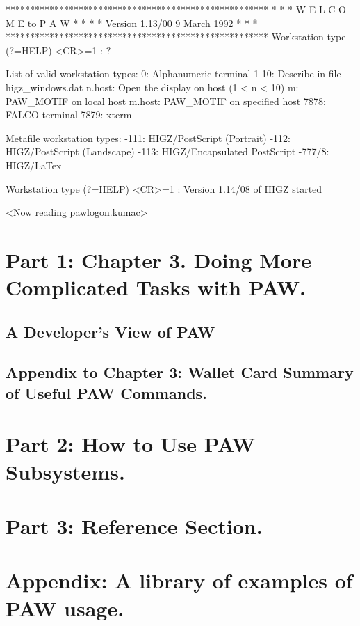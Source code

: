 \begin{XMP}
 ******************************************************
 *                                                    *
 *            W E L C O M E    to   P A W             *
 *                                                    *
 *           Version 1.13/00  9 March 1992            *
 *                                                    *
 ******************************************************
 Workstation type (?=HELP) <CR>=1 : ?
 
 List of valid workstation types:
       0:  Alphanumeric terminal
    1-10:  Describe in file higz_windows.dat
  n.host:  Open the display on host (1 < n < 10)
       m:  PAW_MOTIF on local host
  m.host:  PAW_MOTIF on specified host
    7878:  FALCO terminal
    7879:  xterm
 
 Metafile workstation types:
    -111:  HIGZ/PostScript (Portrait)
    -112:  HIGZ/PostScript (Landscape)
    -113:  HIGZ/Encapsulated PostScript
  -777/8:  HIGZ/LaTex
 
 Workstation type (?=HELP) <CR>=1 :
Version 1.14/08 of HIGZ started
 
<Now reading pawlogon.kumac>
\end{XMP}
 
\section{Part 1: Chapter 3. Doing More Complicated Tasks with PAW.}
\subsection{A Developer's View of PAW}
\subsection*{Appendix to Chapter 3: Wallet Card Summary of
Useful PAW Commands.}
 
 
\section{Part 2: How to Use PAW Subsystems.}
 
\section{Part 3: Reference Section.}
 
\section*{Appendix: A library of examples of PAW usage.}
 

 
 
